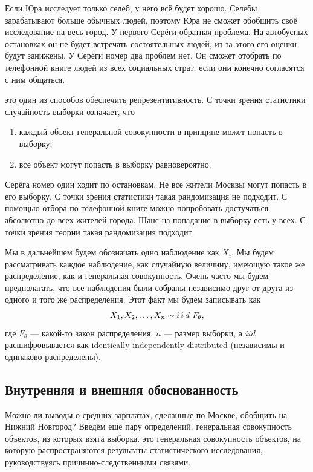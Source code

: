 \documentclass[12pt, a4paper, oneside]{article}
\begin{document}
Если Юра исследует только селеб, у него всё будет хорошо. Селебы зарабатывают больше обычных людей, поэтому Юра не сможет обобщить своё исследование на весь город. У первого Серёги обратная проблема. На автобусных остановках он не будет встречать состоятельных людей, из-за этого его оценки будут занижены. У Серёги номер два проблем нет. Он сможет отобрать по телефонной книге людей из всех социальных страт, если они конечно согласятся с ним общаться. 

 это один из способов обеспечить репрезентативность. С точки зрения статистики случайность выборки означает, что 

\begin{enumerate} 
\item каждый объект генеральной совокупности в принципе может попасть в выборку;
\item все объект могут попасть в выборку равновероятно.
\end{enumerate}

Серёга номер один ходит по остановкам. Не все жители Москвы могут попасть в его выборку. С точки зрения статистики такая рандомизация не подходит. С помощью отбора по телефонной книге можно попробовать достучаться абсолютно до всех жителей города. Шанс на попадание в выборку есть у всех. С точки зрения теории такая рандомизация подходит. 

Мы в дальнейшем будем обозначать одно наблюдение как $X_i$. Мы будем рассматривать каждое наблюдение, как случайную величину, имеющую такое же распределение, как и генеральная совокупность. Очень часто мы будем предполагать, что все наблюдения были собраны независимо друг от друга из одного и того же распределения. Этот факт мы будем записывать как \[ X_1, X_2, \ldots, X_n \sim i\,i\,d\,\, F_{\theta},\] где $F_{\theta}$ --- какой-то закон распределения, $n$ --- размер выборки, а $iid$ расшифровывается как identically independently distributed (независимы и одинаково распределены).


\subsection{Внутренняя и внешняя обоснованность}

Можно ли выводы о средних зарплатах, сделанные по Москве, обобщить на Нижний Новгород? Введём ещё пару определений.  генеральная совокупность объектов, из которых взята выборка.  это генеральная совокупность объектов, на которую распространяются результаты статистического исследования, руководствуясь причинно-следственными связями.
\end{document}
